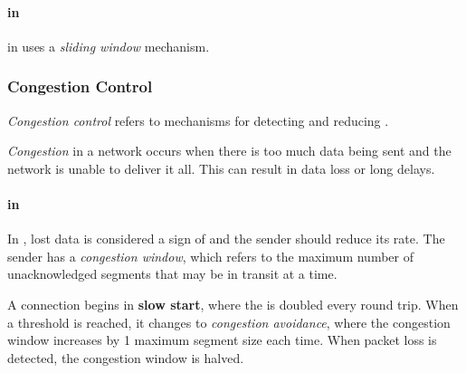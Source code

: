 \paragraph{ in }\label{par:TCP_Flow_Control}
\begin{definition}
   in  uses a \emph{sliding window} mechanism.
\end{definition}

\subsubsection{Congestion Control}\label{subsubsec:Congestion_Control}
\begin{definition}\label{def:Congestion_Control}
  \emph{Congestion control} refers to mechanisms for detecting and reducing .
\end{definition}

\begin{definition}[Congestion]\label{def:Congestion}
  \emph{Congestion} in a network occurs when there is too much data being sent and the network is unable to deliver it all.
  This can result in data loss or long delays.
\end{definition}

\paragraph{ in }\label{par:TCP_Congestion_Control}
\begin{definition}\label{def:Congestion_Window}
  In , lost data is considered a sign of  and the sender should reduce its rate.
  The sender has a \emph{congestion window}, which refers to the maximum number of unacknowledged segments that may be in transit at a time.
\end{definition}

A  connection begins in \textbf{slow start}, where the  is doubled every round trip.
When a threshold is reached, it changes to \emph{congestion avoidance}, where the congestion window increases by 1 maximum segment size each time.
When packet loss is detected, the congestion window is halved.


